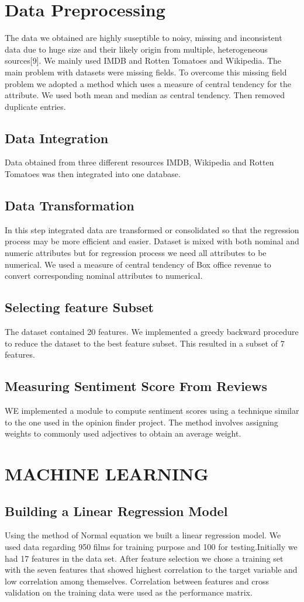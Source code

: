 \section {Data Preprocessing}
The data we obtained are highly suseptible to noisy, missing and inconsistent data due to huge size and their likely origin from multiple, heterogeneous sources[9]. We mainly used IMDB and Rotten Tomatoes and Wikipedia. The main problem  with datasets were missing fields. To overcome this missing field problem we adopted a method which uses a measure of central tendency for the attribute. We used both mean and median as central tendency. Then removed duplicate entries.
\subsection {Data Integration}
Data obtained from three different resources IMDB, Wikipedia and Rotten Tomatoes was then  integrated into one database.
\subsection {Data Transformation}
In this step integrated data are transformed or consolidated so that the regression process may be more efficient and easier.
Dataset is mixed with both nominal and numeric attributes but for regression process we need all attributes to be numerical.
We used a measure of central tendency of Box office revenue to convert corresponding nominal attributes to numerical.
\subsection{Selecting feature Subset}
The dataset contained 20 features. We implemented a greedy backward procedure to reduce the dataset to the best feature subset. This resulted in a subset of 7 features.
\subsection{Measuring Sentiment Score From Reviews}
WE implemented a module to compute sentiment scores using a technique similar to the one used in the opinion finder project. The method involves assigning weights to commonly used adjectives to obtain an average weight.
\clearpage
\section{MACHINE LEARNING}
\subsection {Building a Linear Regression Model}
Using the method of Normal equation we built a linear regression model. We used data regarding 950 films  for training purpose and 100 for testing.Initially we had 17 features in the data set. After feature selection we chose a training set with the seven features that showed highest correlation to the target variable and low correlation among themselves. Correlation between features and cross validation on the training data were used as the performance matrix.


